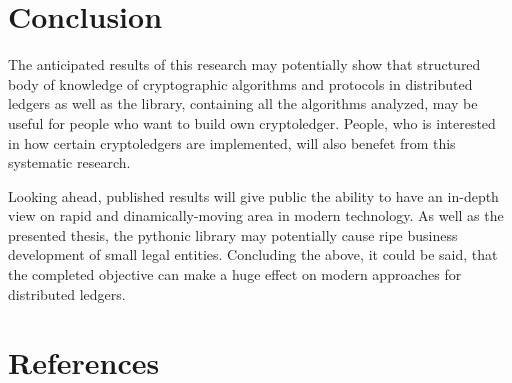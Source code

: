 \documentclass[12pt]{article}
\begin{document}
\section{Conclusion}
The anticipated results of this research may potentially show that
structured body of knowledge of cryptographic algorithms and protocols in
distributed ledgers as well as the library, containing all the algorithms
analyzed, may be useful for people who want to build own cryptoledger. People,
who is interested in how certain cryptoledgers are implemented, will also
benefet from this systematic research.

Looking ahead, published results will give public the ability to have an
in-depth view on rapid and dinamically-moving area in modern technology. As
well as the presented thesis, the pythonic library may potentially cause ripe
business development of small legal entities. Concluding the above, it could be
said, that the completed objective can make a huge effect on modern approaches
for distributed ledgers.

\section{References}
\end{document}
